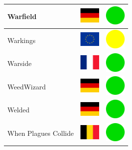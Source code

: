 \documentclass[12pt, a4paper, twoside]{report}
\begin{document}
\begin{center}
\begin{longtable}{|p{5cm}|p{2cm}|p{2cm}|}
 Warfield                                                   & \includegraphics[width=1cm]{../img/flags/de} &   \includegraphics[width=1cm]{../likes/y} \\ \hline
 Warkings                                                   & \includegraphics[width=1cm]{../img/flags/eu} &   \includegraphics[width=1cm]{../likes/m} \\ \hline
 Warside                                                    & \includegraphics[width=1cm]{../img/flags/fr} &   \includegraphics[width=1cm]{../likes/y} \\ \hline
 WeedWizard                                                 & \includegraphics[width=1cm]{../img/flags/de} &   \includegraphics[width=1cm]{../likes/y} \\ \hline
 Welded                                                     & \includegraphics[width=1cm]{../img/flags/de} &   \includegraphics[width=1cm]{../likes/y} \\ \hline
 When Plagues Collide                                       & \includegraphics[width=1cm]{../img/flags/be} &   \includegraphics[width=1cm]{../likes/y} \\ \hline

\end{longtable}
\end{center}
\end{document}
